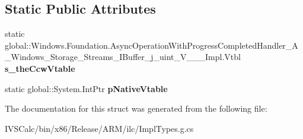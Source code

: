 \subsection*{Static Public Attributes}
\begin{DoxyCompactItemize}
\item 
\mbox{\label{struct_windows_1_1_foundation_1_1_async_operation_with_progress_completed_handler___a___windows_7e4a9a933abf5a83a91ddfaf1616265a_aabf1b7d65cf35bba9d8b3a0404b1523b}} 
static global\+::\+Windows.\+Foundation.\+Async\+Operation\+With\+Progress\+Completed\+Handler\+\_\+\+A\+\_\+\+Windows\+\_\+\+Storage\+\_\+\+Streams\+\_\+\+I\+Buffer\+\_\+j\+\_\+uint\+\_\+\+V\+\_\+\+\_\+\+\_\+\+Impl.\+Vtbl {\bfseries s\+\_\+the\+Ccw\+Vtable}
\item 
\mbox{\label{struct_windows_1_1_foundation_1_1_async_operation_with_progress_completed_handler___a___windows_7e4a9a933abf5a83a91ddfaf1616265a_ac611b3409ed40f5ec2ecc6b50a82f5ab}} 
static global\+::\+System.\+Int\+Ptr {\bfseries p\+Native\+Vtable}
\end{DoxyCompactItemize}


The documentation for this struct was generated from the following file\+:\begin{DoxyCompactItemize}
\item 
I\+V\+S\+Calc/bin/x86/\+Release/\+A\+R\+M/ilc/Impl\+Types.\+g.\+cs\end{DoxyCompactItemize}
